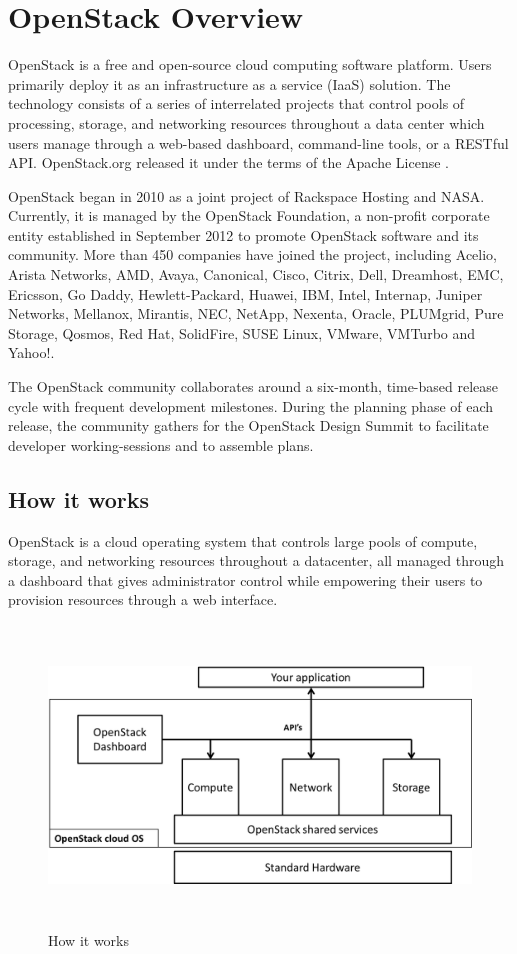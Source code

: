 \chapter{OpenStack Overview}
OpenStack is a free and open-source cloud computing software platform. Users primarily deploy it as an infrastructure as a service (IaaS) solution. The technology consists of a series of interrelated projects that control pools of processing, storage, and networking resources throughout a data center which users manage through a web-based dashboard, command-line tools, or a RESTful API. OpenStack.org released it under the terms of the Apache License \cite{chen} \cite{openstack}.
\par
OpenStack began in 2010 as a joint project of Rackspace Hosting and NASA. Currently, it is managed by the OpenStack Foundation, a non-profit corporate entity established in September 2012 to promote OpenStack software and its community. More than 450 companies have joined the project, including Acelio, Arista Networks, AMD, Avaya, Canonical, Cisco, Citrix, Dell, Dreamhost, EMC, Ericsson, Go Daddy, Hewlett-Packard, Huawei, IBM, Intel, Internap, Juniper Networks, Mellanox, Mirantis, NEC, NetApp, Nexenta, Oracle, PLUMgrid, Pure Storage, Qosmos, Red Hat, SolidFire, SUSE Linux, VMware, VMTurbo and Yahoo!\cite{openstack}.
\par
The OpenStack community collaborates around a six-month, time-based release cycle with frequent development milestones. During the planning phase of each release, the community gathers for the OpenStack Design Summit to facilitate developer working-sessions and to assemble plans\cite{openstack}.
\par

\section{How it works}
    OpenStack is a cloud operating system that controls large pools of compute, storage, and networking resources throughout a datacenter, all managed through a dashboard that gives administrator control while empowering their users to provision resources through a web interface\cite{openstack}.
    \begin{figure}[h]
     \centering
     \includegraphics[height=8cm,width=14cm]{images/hiw.png}
     \caption{How it works }%
     \label{fig:my_label}
    \end{figure}
 
